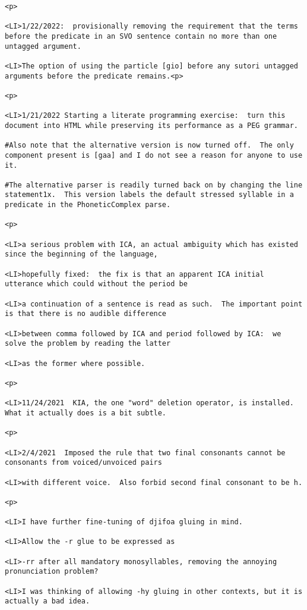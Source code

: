 \documentclass[12pt]{article}
\begin{document}
\begin{lstlisting}
<p>

<LI>1/22/2022:  provisionally removing the requirement that the terms before the predicate in an SVO sentence contain no more than one untagged argument.

<LI>The option of using the particle [gio] before any sutori untagged arguments before the predicate remains.<p>

<p>

<LI>1/21/2022 Starting a literate programming exercise:  turn this document into HTML while preserving its performance as a PEG grammar.

#Also note that the alternative version is now turned off.  The only component present is [gaa] and I do not see a reason for anyone to use it.

#The alternative parser is readily turned back on by changing the line statement1x.  This version labels the default stressed syllable in a predicate in the PhoneticComplex parse.

<p>

<LI>a serious problem with ICA, an actual ambiguity which has existed since the beginning of the language,

<LI>hopefully fixed:  the fix is that an apparent ICA initial utterance which could without the period be

<LI>a continuation of a sentence is read as such.  The important point is that there is no audible difference

<LI>between comma followed by ICA and period followed by ICA:  we solve the problem by reading the latter

<LI>as the former where possible.

<p>

<LI>11/24/2021  KIA, the one "word" deletion operator, is installed.  What it actually does is a bit subtle.

<p>

<LI>2/4/2021  Imposed the rule that two final consonants cannot be consonants from voiced/unvoiced pairs

<LI>with different voice.  Also forbid second final consonant to be h.

<p>

<LI>I have further fine-tuning of djifoa gluing in mind.

<LI>Allow the -r glue to be expressed as

<LI>-rr after all mandatory monosyllables, removing the annoying pronunciation problem?

<LI>I was thinking of allowing -hy gluing in other contexts, but it is actually a bad idea.


\end{lstlisting}
\end{document}
